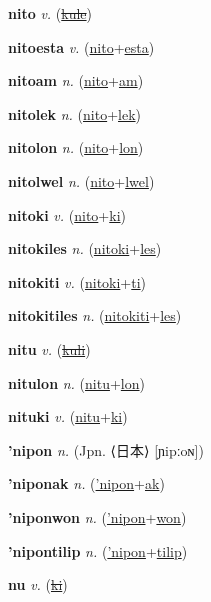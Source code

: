 \textbf{\hypertarget{nito}{nito}} \textit{v.} (\hyperlink{kule}{\sout{kule}})


\textbf{\hypertarget{nitoesta}{nitoesta}} \textit{v.} (\hyperlink{nito}{nito}+\allowbreak \hyperlink{esta}{esta})


\textbf{\hypertarget{nitoam}{nitoam}} \textit{n.} (\hyperlink{nito}{nito}+\allowbreak \hyperlink{am}{am})


\textbf{\hypertarget{nitolek}{nitolek}} \textit{n.} (\hyperlink{nito}{nito}+\allowbreak \hyperlink{lek}{lek})


\textbf{\hypertarget{nitolon}{nitolon}} \textit{n.} (\hyperlink{nito}{nito}+\allowbreak \hyperlink{lon}{lon})


\textbf{\hypertarget{nitolwel}{nitolwel}} \textit{n.} (\hyperlink{nito}{nito}+\allowbreak \hyperlink{lwel}{lwel})


\textbf{\hypertarget{nitoki}{nitoki}} \textit{v.} (\hyperlink{nito}{nito}+\allowbreak \hyperlink{ki}{ki})


\textbf{\hypertarget{nitokiles}{nitokiles}} \textit{n.} (\hyperlink{nitoki}{nitoki}+\allowbreak \hyperlink{les}{les})


\textbf{\hypertarget{nitokiti}{nitokiti}} \textit{v.} (\hyperlink{nitoki}{nitoki}+\allowbreak \hyperlink{ti}{ti})


\textbf{\hypertarget{nitokitiles}{nitokitiles}} \textit{n.} (\hyperlink{nitokiti}{nitokiti}+\allowbreak \hyperlink{les}{les})


\textbf{\hypertarget{nitu}{nitu}} \textit{v.} (\hyperlink{kuli}{\sout{kuli}})


\textbf{\hypertarget{nitulon}{nitulon}} \textit{n.} (\hyperlink{nitu}{nitu}+\allowbreak \hyperlink{lon}{lon})


\textbf{\hypertarget{nituki}{nituki}} \textit{v.} (\hyperlink{nitu}{nitu}+\allowbreak \hyperlink{ki}{ki})


\textbf{\hypertarget{'nipon}{'nipon}} \textit{n.} (Jpn. ⟨{\japanese{}日本}⟩ [ɲipːoɴ])


\textbf{\hypertarget{'niponak}{'niponak}} \textit{n.} (\hyperlink{'nipon}{'nipon}+\allowbreak \hyperlink{ak}{ak})


\textbf{\hypertarget{'niponwon}{'niponwon}} \textit{n.} (\hyperlink{'nipon}{'nipon}+\allowbreak \hyperlink{won}{won})


\textbf{\hypertarget{'nipontilip}{'nipontilip}} \textit{n.} (\hyperlink{'nipon}{'nipon}+\allowbreak \hyperlink{tilip}{tilip})


\textbf{\hypertarget{nu}{nu}} \textit{v.} (\hyperlink{ki}{\sout{ki}})


